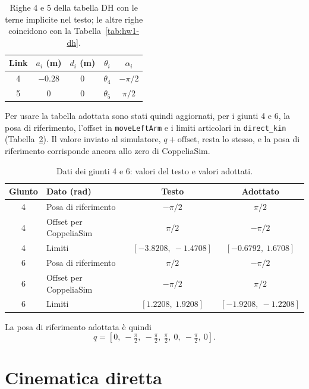 \begin{table}[H]
\centering
\begin{tabular}{|c|c|c|c|c|}
\hline
Link & $a_i$ (m) & $d_i$ (m) & $\theta_i$ & $\alpha_i$ \\
\hline
4 & $-0.28$ & $0$ & $\theta_4$ & $-\pi/2$ \\
5 & $0$ & $0$ & $\theta_5$ & $\pi/2$ \\
\hline
\end{tabular}
\caption{Righe 4 e 5 della tabella DH con le terne implicite nel testo; le altre righe coincidono con la Tabella~\ref{tab:hw1-dh}.}
\label{tab:hw1-dh-testo}
\end{table}

Per usare la tabella adottata sono stati quindi aggiornati, per i giunti 4 e 6, la posa di riferimento, l'offset in \texttt{moveLeftArm} e i limiti articolari in \texttt{direct\_kin} (Tabella~\ref{tab:hw1-dati}).
Il valore inviato al simulatore, $q + \text{offset}$, resta lo stesso, e la posa di riferimento corrisponde ancora allo zero di CoppeliaSim.

\begin{table}[H]
\centering
\renewcommand{\arraystretch}{1.2}
\begin{tabular}{|c|l|c|c|}
\hline
Giunto & Dato (rad) & Testo & Adottato \\
\hline
4 & Posa di riferimento & $-\pi/2$ & $\pi/2$ \\
4 & Offset per CoppeliaSim & $\pi/2$ & $-\pi/2$ \\
4 & Limiti & $[-3.8208,\ -1.4708]$ & $[-0.6792,\ 1.6708]$ \\
\hline
6 & Posa di riferimento & $\pi/2$ & $-\pi/2$ \\
6 & Offset per CoppeliaSim & $-\pi/2$ & $\pi/2$ \\
6 & Limiti & $[1.2208,\ 1.9208]$ & $[-1.9208,\ -1.2208]$ \\
\hline
\end{tabular}
\caption{Dati dei giunti 4 e 6: valori del testo e valori adottati.}
\label{tab:hw1-dati}
\end{table}

La posa di riferimento adottata \`e quindi
\[
q = \left[0,\ -\tfrac{\pi}{2},\ -\tfrac{\pi}{2},\ \tfrac{\pi}{2},\ 0,\ -\tfrac{\pi}{2},\ 0\right].
\]

\section{Cinematica diretta}
\label{sec:hw1-cinematica}

